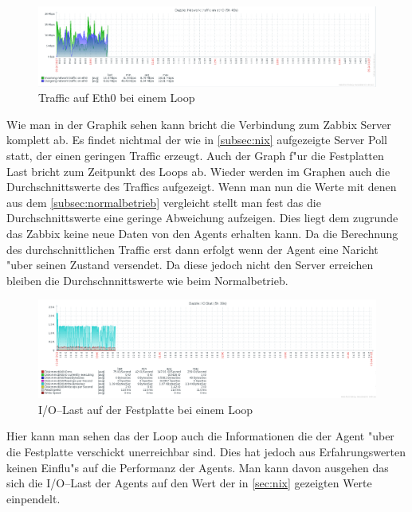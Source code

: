\begin{figure}[htbp]
\centering
\includegraphics*[width=0.9\linewidth]{Abb/ZabbixDazzle/Loop/DazzleLoop}

\caption{Traffic auf Eth0 bei einem Loop}
\label{fig:Eth0DazzleLoop}
\end{figure}

Wie man in der Graphik sehen kann bricht die Verbindung zum Zabbix Server komplett ab. Es findet nichtmal der wie in \cref{subsec:nix} aufgezeigte Server Poll statt, %
der einen geringen Traffic erzeugt. %
Auch der Graph f"ur die Festplatten Last bricht zum Zeitpunkt des Loops ab. Wieder werden im Graphen auch die Durchschnittswerte des Traffics aufgezeigt. %
Wenn man nun die Werte mit denen aus dem \cref{subsec:normalbetrieb} vergleicht stellt man fest das die Durchschnittswerte eine geringe Abweichung aufzeigen. %
Dies liegt dem zugrunde das Zabbix keine neue Daten von den Agents erhalten kann. Da die Berechnung des durchschnittlichen Traffic erst dann erfolgt wenn %
der Agent eine Naricht "uber seinen Zustand versendet. Da diese jedoch nicht den Server erreichen bleiben die Durchschnnittswerte wie beim Normalbetrieb. %

\begin{figure}[htbp]
\centering
\includegraphics*[width=0.9\linewidth]{Abb/ZabbixDazzle/Loop/IoStatDazzleLoop}

\caption{I/O--Last auf der Festplatte bei einem Loop}
\label{fig:IoStatDazzleLoop}
\end{figure}

Hier kann man sehen das der Loop auch die Informationen die der Agent "uber die Festplatte verschickt unerreichbar sind. Dies hat jedoch aus Erfahrungswerten keinen Einflu"s auf die %
Performanz der Agents. Man kann davon ausgehen das sich die I/O--Last der Agents auf den Wert der in \cref{sec:nix} gezeigten Werte einpendelt. %


